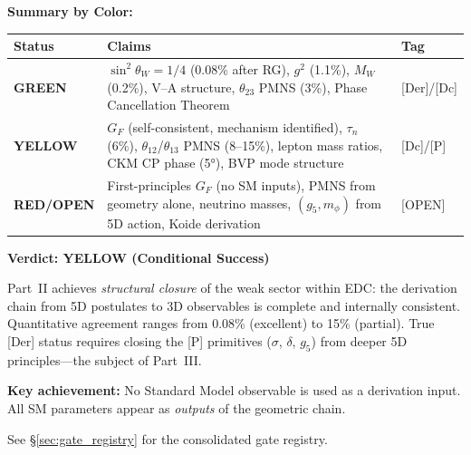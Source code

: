 
\begin{tcolorbox}[breakable, enhanced, colback=blue!5!white, colframe=blue!50!black,
    title=\textbf{Book 2 Overall Stoplight Verdict}, width=\linewidth]

\textbf{Summary by Color:}

\begin{center}
\begin{tabular}{@{}lp{8cm}l@{}}
\toprule
\textbf{Status} & \textbf{Claims} & \textbf{Tag} \\
\midrule
\textcolor{OliveGreen}{\textbf{GREEN}} &
    $\sin^2\theta_W = 1/4$ (0.08\% after RG), $g^2$ (1.1\%), $M_W$ (0.2\%),
    V--A structure, $\theta_{23}$ PMNS (3\%), Phase Cancellation Theorem &
    [Der]/[Dc] \\
\addlinespace
\textcolor{YellowOrange}{\textbf{YELLOW}} &
    $G_F$ (self-consistent, mechanism identified), $\tau_n$ (6\%),
    $\theta_{12}$/$\theta_{13}$ PMNS (8--15\%), lepton mass ratios,
    CKM CP phase (5°), BVP mode structure &
    [Dc]/[P] \\
\addlinespace
\textcolor{BrickRed}{\textbf{RED/OPEN}} &
    First-principles $G_F$ (no SM inputs), PMNS from geometry alone,
    neutrino masses, $(g_5, m_\phi)$ from 5D action, Koide derivation &
    [OPEN] \\
\bottomrule
\end{tabular}
\end{center}

\textbf{Verdict: YELLOW (Conditional Success)}

Part~II achieves \emph{structural closure} of the weak sector within EDC:
the derivation chain from 5D postulates to 3D observables is complete and
internally consistent. Quantitative agreement ranges from 0.08\% (excellent)
to 15\% (partial). True [Der] status requires closing the [P] primitives
($\sigma$, $\delta$, $g_5$) from deeper 5D principles---the subject of Part~III.

\textbf{Key achievement:} No Standard Model observable is used as a derivation
input. All SM parameters appear as \emph{outputs} of the geometric chain.

See \S\ref{sec:gate_registry} for the consolidated gate registry.

\end{tcolorbox}

